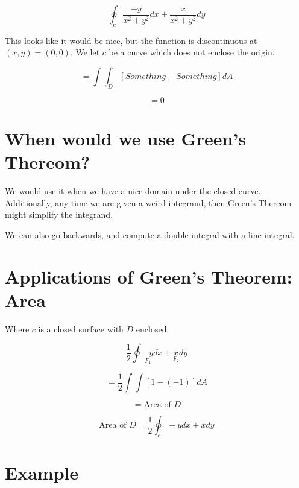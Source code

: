 \documentclass{article}
\begin{document}
\[
\oint_c \dfrac{-y}{x^2+y^2} dx + \dfrac{x}{x^2+y^2} dy
\]

This looks like it would be nice, but the function is discontinuous at $(x,y)=(0,0)$. We let $c$ be a curve which does not enclose the origin.


\[
=\int \int_D \left[ Something - Something \right] dA
\]

\[
=0
\]

\hrulefill

\section*{When would we use Green's Thereom?}

We would use it when we have a nice domain under the closed curve. Additionally, any time we are given a weird integrand, then Green's Thereom might simplify the integrand.

We can also go backwards, and compute a double integral with a line integral.

\section*{Applications of Green's Theorem: Area}

Where $c$ is a closed surface with $D$ enclosed.

\[
\dfrac{1}{2} \oint \underset{F_1}{-y} dx + \underset{F_2}{x} dy
\]

\[
=\dfrac{1}{2} \int \int \left[1 - \left(-1\right)\right] dA
\]

\[
=\text{Area of $D$}
\]

\[
\text{Area of $D$} = \dfrac{1}{2} \oint_c -y dx + x dy
\]

\section*{Example}
\end{document}
